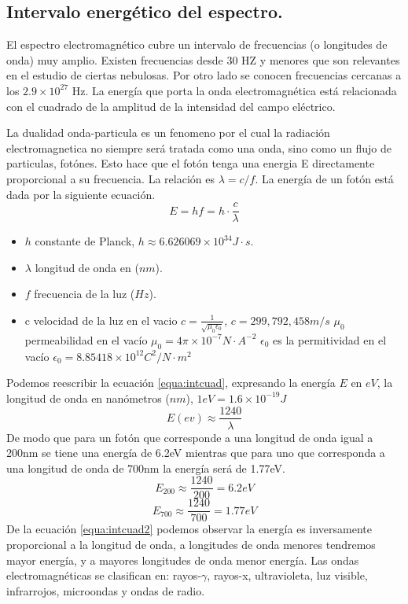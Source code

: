 \subsection{Intervalo energético del espectro.}
El espectro electromagnético cubre un intervalo de frecuencias (o longitudes de onda) muy amplio. Existen frecuencias desde 30 HZ y menores que son relevantes en el estudio de ciertas nebulosas. Por otro lado se conocen frecuencias cercanas a los  $2.9 \times 10^{27}$ Hz.
La energía que porta la onda electromagnética está relacionada con el cuadrado de la amplitud de la intensidad del campo eléctrico. 

La dualidad onda-particula es un fenomeno por el cual la radiación electromagnetica no siempre será tratada como una onda, sino como un flujo de particulas, fotónes. Esto hace que el fotón tenga una energia E directamente proporcional a su frecuencia. La relación es 
$\lambda = c/f$. La energía de un fotón está dada por la siguiente ecuación.
\begin{equation}
E = hf =h\cdot \frac{c}{\lambda}
\label{equa:intcuad}
\end{equation}
\begin{itemize}
	\item $h$ constante de Planck, $h \approx 6.626069\times 10^{34} J\cdot s$.
	\item $\lambda$ longitud de onda en ($nm$).
	\item $f$ frecuencia de la luz ($Hz$).
	\item c velocidad de la luz en el vacio $c = \frac{1}{\sqrt{\mu_0\epsilon_0}}$, $c = 299,792,458 m/s$
	\subitem $\mu_0$ permeabilidad en el vacío $\mu_0 = 4\pi\times10^{-7} N\cdot A^{-2}$
	\subitem $\epsilon_0$ es la permitividad en el vacío $\epsilon_0 = 8.85418\times10^{12} C^2/N\cdot m^2$
	
\end{itemize}
Podemos reescribir la ecuación \ref{equa:intcuad}, expresando la energía $E$ en $eV$, la longitud de onda en nanómetros ($nm$), $1eV = 1.6\times 10^{-19} J$
\begin{equation}
E(ev)\approx \frac{1240}{\lambda}
\label{equa:intcuad2}
\end{equation}
De modo que para un fotón que corresponde a una longitud de onda igual a 200nm se tiene una energía de 6.2eV mientras que para uno que corresponda a una longitud de onda de 700nm la energía será de 1.77eV.
$$E_{200}\approx \frac{1240}{200}=6.2eV $$
$$E_{700}\approx \frac{1240}{700}=1.77eV $$
De la ecuación \ref{equa:intcuad2} podemos observar la energía es inversamente proporcional a la longitud de onda, a longitudes de onda menores tendremos mayor energía, y a mayores longitudes de onda menor energía.
Las ondas electromagnéticas se clasifican en: rayos-$\gamma$, rayos-x, ultravioleta, luz visible, infrarrojos, microondas y ondas de radio.

